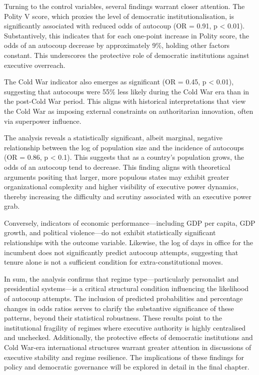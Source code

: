 \documentclass[
  12pt,
]{report}
\begin{document}
Turning to the control variables, several findings warrant closer
attention. The Polity V score, which proxies the level of democratic
institutionalisation, is significantly associated with reduced odds of
autocoup (OR = 0.91, p \textless{} 0.01). Substantively, this indicates
that for each one-point increase in Polity score, the odds of an
autocoup decrease by approximately 9\%, holding other factors constant.
This underscores the protective role of democratic institutions against
executive overreach.

The Cold War indicator also emerges as significant (OR = 0.45, p
\textless{} 0.01), suggesting that autocoups were 55\% less likely
during the Cold War era than in the post-Cold War period. This aligns
with historical interpretations that view the Cold War as imposing
external constraints on authoritarian innovation, often via superpower
influence.

The analysis reveals a statistically significant, albeit marginal,
negative relationship between the log of population size and the
incidence of autocoups (OR = 0.86, p \textless{} 0.1). This suggests
that as a country's population grows, the odds of an autocoup tend to
decrease. This finding aligns with theoretical arguments positing that
larger, more populous states may exhibit greater organizational
complexity and higher visibility of executive power dynamics, thereby
increasing the difficulty and scrutiny associated with an executive
power grab.

Conversely, indicators of economic performance---including GDP per
capita, GDP growth, and political violence---do not exhibit
statistically significant relationships with the outcome variable.
Likewise, the log of days in office for the incumbent does not
significantly predict autocoup attempts, suggesting that tenure alone is
not a sufficient condition for extra-constitutional moves.

In sum, the analysis confirms that regime type---particularly
personalist and presidential systems---is a critical structural
condition influencing the likelihood of autocoup attempts. The inclusion
of predicted probabilities and percentage changes in odds ratios serves
to clarify the substantive significance of these patterns, beyond their
statistical robustness. These results point to the institutional
fragility of regimes where executive authority is highly centralised and
unchecked. Additionally, the protective effects of democratic
institutions and Cold War-era international structures warrant greater
attention in discussions of executive stability and regime resilience.
The implications of these findings for policy and democratic governance
will be explored in detail in the final chapter.
\end{document}
